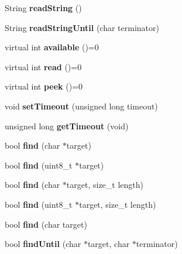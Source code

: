 \begin{DoxyCompactItemize}
String {\bfseries read\+String} ()
\item 
\mbox{\label{class_stream_a6a409da87c552909260d8cc428c5ca70}} 
String {\bfseries read\+String\+Until} (char terminator)
\item 
\mbox{\label{class_stream_a9c98a763395005c08ce95afb2f06c7b1}} 
virtual int {\bfseries available} ()=0
\item 
\mbox{\label{class_stream_aea5dee9fcb038148515b7c9212d38dc0}} 
virtual int {\bfseries read} ()=0
\item 
\mbox{\label{class_stream_a30c3c212ec6ea67277a708c5ea2501a5}} 
virtual int {\bfseries peek} ()=0
\item 
\mbox{\label{class_stream_a851dd6dc74d52389de04f99648478db5}} 
void {\bfseries set\+Timeout} (unsigned long timeout)
\item 
\mbox{\label{class_stream_abc982d9972a4c7fdabcf7ba9ab325ed1}} 
unsigned long {\bfseries get\+Timeout} (void)
\item 
\mbox{\label{class_stream_a4bab30ccd324efd461dee46a2339f673}} 
bool {\bfseries find} (char $\ast$target)
\item 
\mbox{\label{class_stream_a250f5e805979bad3efb0ef33038de457}} 
bool {\bfseries find} (uint8\+\_\+t $\ast$target)
\item 
\mbox{\label{class_stream_ad851401f2318cdb1de05707e021b81d9}} 
bool {\bfseries find} (char $\ast$target, size\+\_\+t length)
\item 
\mbox{\label{class_stream_abe254745b98af8037d10fef6126e42df}} 
bool {\bfseries find} (uint8\+\_\+t $\ast$target, size\+\_\+t length)
\item 
\mbox{\label{class_stream_a4f529a9d7309aedf535fb1a6757a5675}} 
bool {\bfseries find} (char target)
\item 
\mbox{\label{class_stream_ad1f5f6600832396fb38a897baf4de35b}} 
bool {\bfseries find\+Until} (char $\ast$target, char $\ast$terminator)

\end{DoxyCompactItemize}
